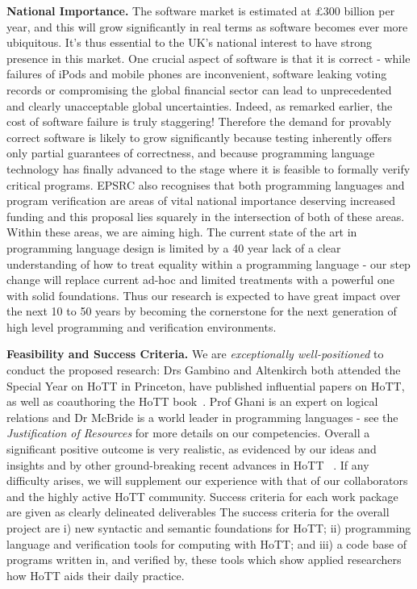 \documentclass[a4paper,11pt]{article}
\begin{document}
{\bf National Importance.} The software market is estimated at
$\pounds 300$ billion per year, and this will grow significantly in
real terms as software becomes ever more ubiquitous. It's thus
essential to the UK's national interest to have strong presence in
this market. One crucial aspect of software is that it is correct - while failures of
iPods and mobile phones are inconvenient,
software leaking voting records or compromising the global financial
sector can lead to unprecedented and clearly unacceptable global
uncertainties. Indeed, as remarked earlier, the cost of software failure is
truly staggering!  Therefore the
demand for provably correct software is likely to grow significantly because testing inherently
offers only partial guarantees of correctness, and because
programming language technology has finally advanced to the stage
where it is feasible to formally verify critical programs.  EPSRC
also recognises that both programming languages and program verification are
areas of vital national importance deserving increased funding and
this proposal lies squarely in the intersection of both of these areas. Within
these areas, we are aiming high.  The current state of the art in
programming language design is limited by a 40 year lack of a clear
understanding of how to treat equality within a programming language -
our step change will replace current ad-hoc and limited
treatments with a powerful one with solid foundations. Thus our
research is expected to have great impact 
over the next 10 to 50 years by becoming the
cornerstone for the next generation of high level programming and
verification environments.


{\bf Feasibility and Success Criteria.} 
We are {\em exceptionally
  well-positioned} to conduct the proposed research: Drs Gambino and
Altenkirch both attended the Special Year on HoTT in Princeton, have
published influential papers on HoTT, as well as coauthoring the HoTT
book~\cite{hott-book}. Prof Ghani is an expert on logical relations
and Dr McBride is a world leader in programming languages - see the
{\em Justification of Resources} for more details on our
competencies. Overall a significant positive outcome is very
realistic, as evidenced by our ideas and insights 
and by other ground-breaking recent advances in HoTT
~\cite{ShulmanM:uniidh,BezemM:cubsmt}. If any
difficulty arises, we will supplement our experience with that of our
collaborators and the highly active HoTT community. Success criteria
for each work package are given as clearly delineated deliverables 
The success
criteria for the overall project are i) new syntactic and semantic
foundations for HoTT; ii) programming language and verification tools
for computing with HoTT; and iii) a code base of programs written in,
and verified by, these tools which show applied researchers how HoTT
aids their daily practice.
\end{document}

